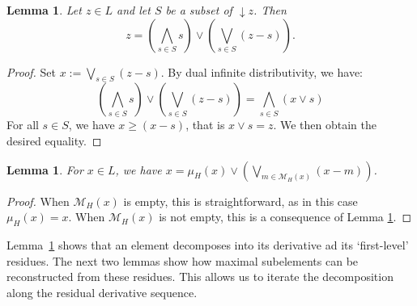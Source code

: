 \documentclass{article}
\newtheorem{lemma}[theorem]{Lemma}
\begin{document}
\begin{lemma}\label{lemma.sum.complements}
    Let $z \in L$ and let $S$ be a subset of $\mathop{\downarrow}z$. Then
    \[z = \left(\bigwedge_{s \in S} s \right)\vee \left(\bigvee_{s \in S} (z-s)\right).\]
\end{lemma}
\begin{proof}
Set \(x := \bigvee_{s \in S}(z-s).\) By dual infinite distributivity, we have: 
\[\left(\bigwedge_{s \in S} s \right)\vee \left(\bigvee_{s \in S} (z-s)\right) = \bigwedge_{s \in S} (x \vee s)\]
For all $s \in S$, we have $x \ge (x-s) $, that is $x \vee s = z$. We then obtain the desired equality.    
\end{proof}

\begin{lemma}\label{lemma.cover.complements}
    For $x \in L$, we have $x = \mu_H(x) \vee \left(\underset{{m \in \mathcal{M}_H(x)}}{\bigvee}(x-m)\right)$.
\end{lemma}

\begin{proof}
{When $\mathcal{M}_H(x)$ is empty, this is straightforward, as in this case $\mu_H(x)= x$. When $\mathcal{M}_H(x)$ is not empty, this is a consequence of Lemma \ref{lemma.sum.complements}.}
\end{proof}

{Lemma~\ref{lemma.cover.complements} shows that an element decomposes into its derivative ad its `first-level' residues. The next two lemmas show how maximal subelements can be reconstructed from these residues. This allows us to iterate the decomposition along the residual derivative sequence.}
\end{document}
